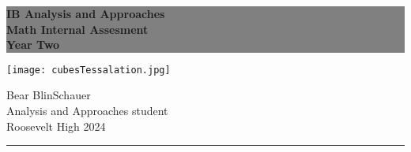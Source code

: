 \begin{titlepage} %
\colorbox{grey}{
	\parbox[t]{0.93\textwidth}{ %
		\parbox[t]{0.91\textwidth}{ %
			\raggedleft %
			\fontsize{20pt}{30pt}\selectfont %
			\vspace{0.7cm} %
			\color{color1}\sffamily\bfseries
			IB Analysis and Approaches\\
			Math Internal Assesment\\
			Year Two\\
			\vspace{0.7cm} %
		}
	}
}
	\vspace{-0.5\baselineskip} %
		\raggedleft %
		\texttt{[image: cubesTessalation.jpg]}
	\vfill %
	\parbox[t]{0.93\textwidth}{ %
		\raggedleft %
		\large %
		{\Large Bear BlinSchauer}\\[4pt] %
		Analysis and Approaches student\\
		Roosevelt High 2024\\[4pt] %
		\hfill\rule{0.2\linewidth}{1pt}%
	}
\end{titlepage}

\maketitle %


